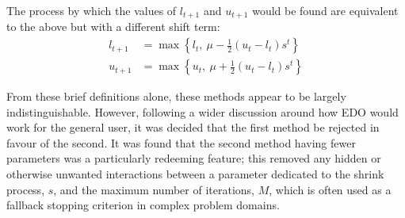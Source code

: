 The process by which the values of \(l_{t+1}\) and \(u_{t+1}\) would be found
are equivalent to the above but with a different shift term:
\begin{align}
    \label{eq:shrinking_lower}
    l_{t+1}&= \max \left\{l_t, \ \mu - \frac{1}{2} (u_t - l_t) s^t\right\}\\
    \label{eq:shrinking_upper}
    u_{t+1}&= \max \left\{u_t, \ \mu + \frac{1}{2} (u_t - l_t) s^t\right\}
\end{align}

From these brief definitions alone, these methods appear to be largely
indistinguishable. However, following a wider discussion around how EDO would
work for the general user, it was decided that the first method be rejected in
favour of the second. It was found that the second method having fewer
parameters was a particularly redeeming feature; this removed any hidden or
otherwise unwanted interactions between a parameter dedicated to the shrink
process, \(s\), and the maximum number of iterations, \(M\), which is often used
as a fallback stopping criterion in complex problem domains.


